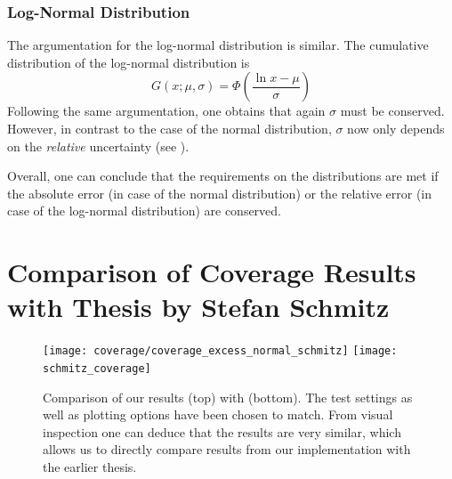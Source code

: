 \subsubsection{Log-Normal Distribution}

The argumentation for the log-normal distribution is similar. The cumulative distribution of the log-normal distribution is 
\begin{equation}
    G(x; \mu, \sigma) = \Phi\left(\frac{\ln x - \mu}{\sigma}\right)
\end{equation}
Following the same argumentation, one obtains that again $\sigma$ must be conserved. However, in contrast to the case of the normal distribution, $\sigma$ now only depends on the \emph{relative} uncertainty (see ).

Overall, one can conclude that the requirements on the distributions are met if the absolute error (in case of the normal distribution) or the relative error (in case of the log-normal distribution) are conserved.

\newpage
\section{Comparison of Coverage Results with Thesis by Stefan Schmitz}
\label{app:coverage_schmitz}

\begin{figure}
    \centering
    \texttt{[image: coverage/coverage\_excess\_normal\_schmitz]}
    \texttt{[image: schmitz\_coverage]}
    \caption{Comparison of our results (top) with \cite{Schmitz:ModelUnspecificSearch} (bottom). The test settings as well as plotting options have been chosen to match. From visual inspection one can deduce that the results are very similar, which allows us to directly compare results from our implementation with the earlier thesis.}
    \label{fig:coverage_schmitz}
\end{figure}
